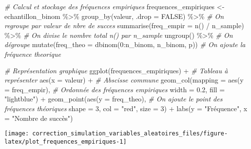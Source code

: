 \documentclass[
]{article}
\newenvironment{Shaded}{\begin{snugshade}}{\end{snugshade}}
\newcommand{\AttributeTok}[1]{\textcolor[rgb]{0.77,0.63,0.00}{#1}}
\newcommand{\CommentTok}[1]{\textcolor[rgb]{0.56,0.35,0.01}{\textit{#1}}}
\newcommand{\ConstantTok}[1]{\textcolor[rgb]{0.00,0.00,0.00}{#1}}
\newcommand{\DecValTok}[1]{\textcolor[rgb]{0.00,0.00,0.81}{#1}}
\newcommand{\FloatTok}[1]{\textcolor[rgb]{0.00,0.00,0.81}{#1}}
\newcommand{\FunctionTok}[1]{\textcolor[rgb]{0.00,0.00,0.00}{#1}}
\newcommand{\NormalTok}[1]{#1}
\newcommand{\OtherTok}[1]{\textcolor[rgb]{0.56,0.35,0.01}{#1}}
\newcommand{\SpecialCharTok}[1]{\textcolor[rgb]{0.00,0.00,0.00}{#1}}
\newcommand{\StringTok}[1]{\textcolor[rgb]{0.31,0.60,0.02}{#1}}
\begin{document}
\begin{Shaded}
\begin{Highlighting}[]
\CommentTok{\# Calcul et stockage des fréquences empiriques}
\NormalTok{frequences\_empiriques }\OtherTok{\textless{}{-}}\NormalTok{ echantillon\_binom }\SpecialCharTok{\%\textgreater{}\%} 
  \FunctionTok{group\_by}\NormalTok{(valeur, }\AttributeTok{.drop =} \ConstantTok{FALSE}\NormalTok{) }\SpecialCharTok{\%\textgreater{}\%} \CommentTok{\# On regroupe par valeur de nbre de succes}
  \FunctionTok{summarise}\NormalTok{(}\AttributeTok{freq\_empir =} \FunctionTok{n}\NormalTok{() }\SpecialCharTok{/}\NormalTok{ n\_sample) }\SpecialCharTok{\%\textgreater{}\%} \CommentTok{\# On divise le nombre total n() par n\_sample}
  \FunctionTok{ungroup}\NormalTok{() }\SpecialCharTok{\%\textgreater{}\%} \CommentTok{\# On dégroupe}
  \FunctionTok{mutate}\NormalTok{(}\AttributeTok{freq\_theo =} \FunctionTok{dbinom}\NormalTok{(}\DecValTok{0}\SpecialCharTok{:}\NormalTok{n\_binom, n\_binom, p)) }\CommentTok{\# On ajoute la fréquence theorique}
\end{Highlighting}
\end{Shaded}

\begin{Shaded}
\begin{Highlighting}[]
\CommentTok{\# Représentation graphique}
\FunctionTok{ggplot}\NormalTok{(frequences\_empiriques) }\SpecialCharTok{+} \CommentTok{\# Tableau à représenter}
  \FunctionTok{aes}\NormalTok{(}\AttributeTok{x =}\NormalTok{ valeur) }\SpecialCharTok{+} \CommentTok{\# Abscisse commune}
  \FunctionTok{geom\_col}\NormalTok{(}\AttributeTok{mapping =} \FunctionTok{aes}\NormalTok{(}\AttributeTok{y =}\NormalTok{ freq\_empir), }\CommentTok{\# Ordonnée des fréquences empiriques}
           \AttributeTok{width =} \FloatTok{0.2}\NormalTok{, }\AttributeTok{fill =} \StringTok{"lightblue"}\NormalTok{) }\SpecialCharTok{+}
  \FunctionTok{geom\_point}\NormalTok{(}\FunctionTok{aes}\NormalTok{(}\AttributeTok{y =}\NormalTok{ freq\_theo), }\CommentTok{\# On ajoute le point des fréquences théoriques }
             \AttributeTok{shape =} \DecValTok{3}\NormalTok{, }\AttributeTok{col =} \StringTok{"red"}\NormalTok{, }\AttributeTok{size =} \DecValTok{3}\NormalTok{) }\SpecialCharTok{+}
  \FunctionTok{labs}\NormalTok{(}\AttributeTok{y =} \StringTok{"Fréquence"}\NormalTok{, }\AttributeTok{x =} \StringTok{"Nombre de succès"}\NormalTok{)}
\end{Highlighting}
\end{Shaded}

\begin{center}\texttt{[image: correction\_simulation\_variables\_aleatoires\_files/figure-latex/plot\_frequences\_empiriques-1]} \end{center}
\end{document}
